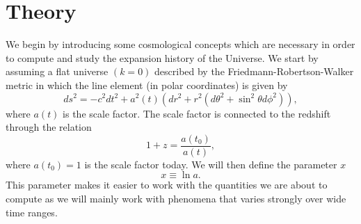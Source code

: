 \documentclass[a4paper, 10pt, reqno]{amsart}
\begin{document}
\section{Theory}
We begin by introducing some cosmological concepts which are necessary
in order to compute and study the expansion history of the Universe. We
start by assuming a flat universe $(k=0)$ described by the
Friedmann-Robertson-Walker metric in which the line element (in polar
coordinates) is given by
\begin{equation}\label{eq: ds}
    ds^2 = -c^2 dt^2 + a^2(t) \left( dr^2 + r^2(d\theta^2 + \sin^2
    \theta d\phi^2) \right),
\end{equation}
where $a(t)$ is the scale factor. The scale factor is connected to the
redshift through the relation
\begin{equation}\label{eq: redshift}
    1 + z = \frac{a(t_0)}{a(t)},
\end{equation}
where $a(t_0) = 1$ is the scale factor today. We will then define the
parameter $x$
\begin{equation}\label{eq: x}
    x \equiv \ln a.
\end{equation}
This parameter makes it easier to work with the quantities we are about
to compute as we will mainly work with phenomena that varies strongly
over wide time ranges. 
\end{document}
